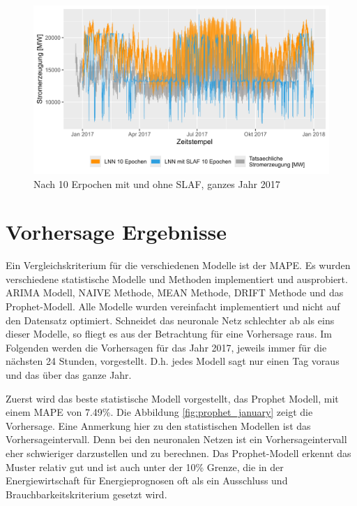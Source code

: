 \documentclass[11pt,ngerman,a4paper,]{article}
\begin{document}
\begin{figure}[H]
\centering
\includegraphics[width=1.0\textwidth]{plots/10_epochs_all_time_cobmined_nnLNN mit SLAF 10 Epochen.png}
\caption{Nach 10 Erpochen mit und ohne SLAF, ganzes Jahr 2017}
\label{fig:slaf_lnn_10_epochs_2017}
\end{figure}

\clearpage
\newpage

\section{Vorhersage Ergebnisse}\label{vorhersage-ergebnisse}

Ein Vergleichskriterium für die verschiedenen Modelle ist der MAPE. Es wurden verschiedene statistische Modelle und Methoden implementiert und ausprobiert. ARIMA Modell, NAIVE Methode, MEAN Methode, DRIFT Methode und das Prophet-Modell. Alle Modelle wurden vereinfacht implementiert und nicht auf den Datensatz optimiert. Schneidet das neuronale Netz schlechter ab als eins dieser Modelle, so fliegt es aus der Betrachtung für eine Vorhersage raus. Im Folgenden werden die Vorhersagen für das Jahr 2017, jeweils immer für die nächsten 24 Stunden, vorgestellt. D.h. jedes Modell sagt nur einen Tag voraus und das über das ganze Jahr.

Zuerst wird das beste statistische Modell vorgestellt, das Prophet Modell, mit einem MAPE von 7.49\%. Die Abbildung \ref{fig:prophet_january} zeigt die Vorhersage. Eine Anmerkung hier zu den statistischen Modellen ist das Vorhersageintervall. Denn bei den neuronalen Netzen ist ein Vorhersageintervall eher schwieriger darzustellen und zu berechnen. Das Prophet-Modell erkennt das Muster relativ gut und ist auch unter der 10\% Grenze, die in der Energiewirtschaft für Energieprognosen oft als ein Ausschluss und Brauchbarkeitskriterium gesetzt wird.
\end{document}
